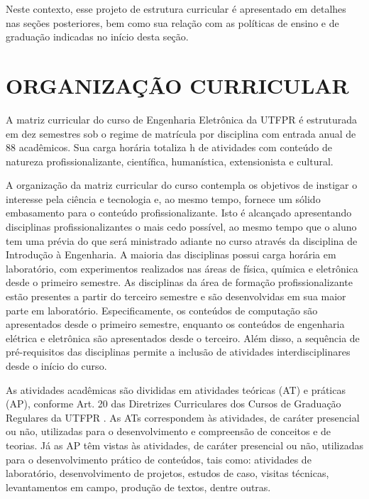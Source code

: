 Neste contexto, esse projeto de estrutura curricular é apresentado em detalhes nas seções posteriores, bem como sua relação com as políticas de ensino e de graduação indicadas no início desta seção.


\section{ORGANIZAÇÃO CURRICULAR}

A matriz curricular do curso de Engenharia Eletrônica da UTFPR é estruturada em dez semestres sob o regime de matrícula por disciplina com entrada anual de 88 acadêmicos. Sua carga horária totaliza \the\value{horasT} h de atividades com conteúdo de natureza profissionalizante, científica, humanística, extensionista e cultural.

A organização da matriz curricular do curso contempla os objetivos de instigar o interesse pela ciência e tecnologia e, ao mesmo tempo, fornece um sólido embasamento para o conteúdo profissionalizante. Isto é alcançado apresentando disciplinas profissionalizantes o mais cedo possível, ao mesmo tempo que o aluno tem uma prévia do que será ministrado adiante no curso através da disciplina de Introdução à Engenharia. A maioria das disciplinas possui carga horária em laboratório, com experimentos realizados nas áreas de física, química e eletrônica desde o primeiro semestre. As disciplinas da área de formação profissionalizante estão presentes a partir do terceiro semestre e são desenvolvidas em sua maior parte em laboratório. Especificamente, os conteúdos de computação são apresentados desde o primeiro semestre, enquanto os conteúdos de engenharia elétrica e eletrônica são apresentados desde o terceiro. Além disso, a sequência de pré-requisitos das disciplinas permite a inclusão de atividades interdisciplinares desde o início do curso.


As atividades acadêmicas são divididas em atividades teóricas (AT) e práticas (AP), conforme Art. 20 das Diretrizes Curriculares dos Cursos de Graduação Regulares da UTFPR \cite{cogep142}. As ATs correspondem às atividades, de caráter presencial ou não, utilizadas para o desenvolvimento e compreensão de conceitos e de teorias. Já as AP têm vistas às atividades, de caráter presencial ou não, utilizadas para o desenvolvimento prático de conteúdos, tais como: atividades de laboratório, desenvolvimento de projetos, estudos de caso, visitas técnicas, levantamentos em campo, produção de textos, dentre outras.


